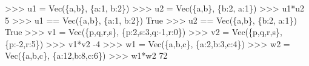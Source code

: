 \documentclass[
  letterpaper,
  DIV=11,
  numbers=noendperiod]{scrartcl}
\newenvironment{Shaded}{\begin{snugshade}}{\end{snugshade}}
\newcommand{\CommentTok}[1]{\textcolor[rgb]{0.37,0.37,0.37}{#1}}
\begin{document}
\begin{Shaded}
\begin{Highlighting}[numbers=left,,]
\CommentTok{    \textgreater{}\textgreater{}\textgreater{} u1 = Vec(\{\textquotesingle{}a\textquotesingle{},\textquotesingle{}b\textquotesingle{}\}, \{\textquotesingle{}a\textquotesingle{}:1, \textquotesingle{}b\textquotesingle{}:2\})}
\CommentTok{    \textgreater{}\textgreater{}\textgreater{} u2 = Vec(\{\textquotesingle{}a\textquotesingle{},\textquotesingle{}b\textquotesingle{}\}, \{\textquotesingle{}b\textquotesingle{}:2, \textquotesingle{}a\textquotesingle{}:1\})}
\CommentTok{    \textgreater{}\textgreater{}\textgreater{} u1*u2}
\CommentTok{    5}
\CommentTok{    \textgreater{}\textgreater{}\textgreater{} u1 == Vec(\{\textquotesingle{}a\textquotesingle{},\textquotesingle{}b\textquotesingle{}\}, \{\textquotesingle{}a\textquotesingle{}:1, \textquotesingle{}b\textquotesingle{}:2\})}
\CommentTok{    True}
\CommentTok{    \textgreater{}\textgreater{}\textgreater{} u2 == Vec(\{\textquotesingle{}a\textquotesingle{},\textquotesingle{}b\textquotesingle{}\}, \{\textquotesingle{}b\textquotesingle{}:2, \textquotesingle{}a\textquotesingle{}:1\})}
\CommentTok{    True}
\CommentTok{    \textgreater{}\textgreater{}\textgreater{} v1 = Vec(\{\textquotesingle{}p\textquotesingle{},\textquotesingle{}q\textquotesingle{},\textquotesingle{}r\textquotesingle{},\textquotesingle{}s\textquotesingle{}\}, \{\textquotesingle{}p\textquotesingle{}:2,\textquotesingle{}s\textquotesingle{}:3,\textquotesingle{}q\textquotesingle{}:{-}1,\textquotesingle{}r\textquotesingle{}:0\})}
\CommentTok{    \textgreater{}\textgreater{}\textgreater{} v2 = Vec(\{\textquotesingle{}p\textquotesingle{},\textquotesingle{}q\textquotesingle{},\textquotesingle{}r\textquotesingle{},\textquotesingle{}s\textquotesingle{}\}, \{\textquotesingle{}p\textquotesingle{}:{-}2,\textquotesingle{}r\textquotesingle{}:5\})}
\CommentTok{    \textgreater{}\textgreater{}\textgreater{} v1*v2}
\CommentTok{    {-}4}
\CommentTok{    \textgreater{}\textgreater{}\textgreater{} w1 = Vec(\{\textquotesingle{}a\textquotesingle{},\textquotesingle{}b\textquotesingle{},\textquotesingle{}c\textquotesingle{}\}, \{\textquotesingle{}a\textquotesingle{}:2,\textquotesingle{}b\textquotesingle{}:3,\textquotesingle{}c\textquotesingle{}:4\})}
\CommentTok{    \textgreater{}\textgreater{}\textgreater{} w2 = Vec(\{\textquotesingle{}a\textquotesingle{},\textquotesingle{}b\textquotesingle{},\textquotesingle{}c\textquotesingle{}\}, \{\textquotesingle{}a\textquotesingle{}:12,\textquotesingle{}b\textquotesingle{}:8,\textquotesingle{}c\textquotesingle{}:6\})}
\CommentTok{    \textgreater{}\textgreater{}\textgreater{} w1*w2}
\CommentTok{    72}


\end{Highlighting}
\end{Shaded}
\end{document}
